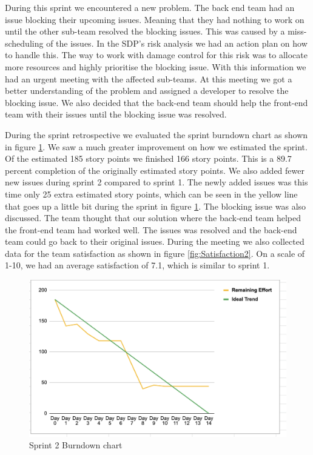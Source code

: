 \documentclass{article}
\begin{document}
During this sprint we encountered a new problem. The back end team had an issue blocking their upcoming issues. Meaning that they had nothing to work on until the other sub-team resolved the blocking issues. This was caused by a miss-scheduling of the issues. In the SDP's risk analysis we had an action plan on how to handle this. The way to work with damage control for this risk was to allocate more resources and highly prioritise the blocking issue. With this information we had an urgent meeting with the affected sub-teams. At this meeting we got a better understanding of the problem and assigned a developer to resolve the blocking issue. We also decided that the back-end team should help the front-end team with their issues until the blocking issue was resolved. 

During the sprint retrospective we evaluated the sprint burndown chart as shown in figure \ref{fig:Burndown2}. We saw a much greater improvement on how we estimated the sprint. Of the estimated 185 story points we finished 166 story points. This is a 89.7 percent completion of the originally estimated story points. We also added fewer new issues during sprint 2 compared to sprint 1. The newly added issues was this time only 25 extra estimated story points, which can be seen in the yellow line that goes up a little bit during the sprint in figure \ref{fig:Burndown2}. The blocking issue was also discussed. The team thought that our solution where the back-end team helped the front-end team had worked well. The issues was resolved and the back-end team could go back to their original issues. During the meeting we also collected data for the team satisfaction as shown in figure \ref{fig:Satisfaction2}. On a scale of 1-10, we had an average satisfaction of 7.1, which is similar to sprint 1.

\begin{figure}[h!]
    \centering
    \includegraphics[scale=0.6]{pfrFigures/Sprint2.png}
    \caption{Sprint 2 Burndown chart}
    \label{fig:Burndown2}
\end{figure}
\end{document}
